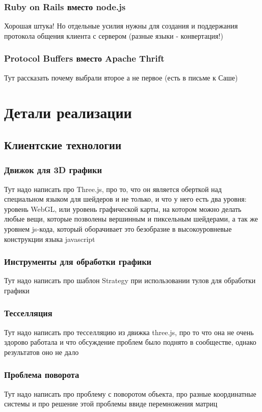 \documentclass[12pt, a4paper]{article}
\let\stdsection\section
\renewcommand\section{\newpage\stdsection}
\begin{document}
\subsubsection{Ruby on Rails вместо node.js}
Хорошая штука! Но отдельные усилия нужны для создания и поддержания протокола
общения клиента с сервером (разные языки - конвертация!)
\subsubsection{Protocol Buffers вместо Apache Thrift}
Тут рассказать почему выбрали второе а не первое (есть в письме к Саше)

\section{Детали реализации}
\subsection{Клиентские технологии}
\subsubsection{Движок для 3D графики}
Тут надо написать про Three.js, про то, что он является оберткой над специальном
языком для шейдеров и не только, и что у него есть два уровня: уровень WebGL,
или уровень графической карты, на котором можно делать любые вещи, которые
позволены вершинным и пиксельным шейдерами, а так же уровнем js-кода, который
оборачивает это безобразие в высокоуровневые конструкции языка javascript

\subsubsection{Инструменты для обработки графики}
Тут надо написать про шаблон Strategy при использовании
тулов для обработки графики
\subsubsection{Тесселляция}
Тут надо написать про тесселляцию из движка three.js, про то
что она не очень здорово работала и что обсуждение проблем было поднято в
сообществе, однако результатов оно не дало
\subsubsection{Проблема поворота}
Тут надо написать про проблему с поворотом объекта, про разные
координатные системы и про решение этой проблемы ввиде перемножения
матриц
\end{document}
